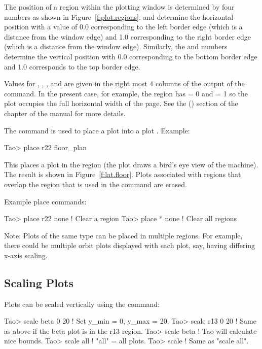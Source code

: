 \documentclass{hitec}     %
\begin{document}
The position of a region within the plotting window is determined by four numbers as shown in
Figure~\ref{f:plot.regions}.  and  determine the horizontal position with a value of
0.0 corresponding to the left border edge (which is a distance  from the window edge) and
1.0 corresponding to the right border edge (which is a distance  from the window edge).
Similarly, the  and  numbers determine the vertical position with 0.0 corresponding to
the bottom border edge and 1.0 corresponds to the top border edge. 

Values for , , , and  are given in the right most 4 columns of the
output of the  command.  In the present case, for example, the  region has
 = 0 and  = 1 so the plot occupies the full horizontal width of the page.  See the
 () section of the  chapter of
the \tao manual for more details.

The  command is used to place a  plot into a plot . Example:
\begin{code}
Tao> place r22 floor_plan
\end{code}
This places a  plot in the  region (the  plot draws a
bird's eye view of the machine). 
The result is shown in Figure~\ref{f:lat.floor}. Plots associated with regions
that overlap the region that is used in the  command are erased. 

Example place commands:
\begin{code}
Tao> place r22 none    ! Clear a region
Tao> place * none      ! Clear all regions
\end{code}

Note: Plots of the same type can be placed in multiple regions. For example, there could be multiple
orbit plots displayed with each plot, say, having differing x-axis scaling.

\subsection{Scaling Plots}

Plots can be scaled vertically using the  command:
\begin{code}
Tao> scale beta 0 20  ! Set y_min = 0, y_max = 20.
Tao> scale r13 0 20   ! Same as above if the beta plot is in the r13 region.
Tao> scale beta       ! Tao will calculate nice bounds.
Tao> scale all        ! "all" = all plots.
Tao> scale            ! Same as "scale all".
\end{code}
\end{document}
